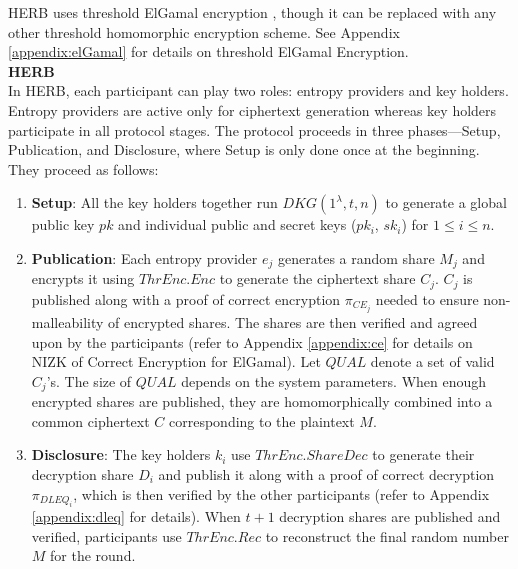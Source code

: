 \documentclass[letterpaper,twocolumn,10pt]{article}
\theoremstyle{definition}
\theoremstyle{remark}
\begin{document}
 HERB \cite{cherniaeva2019homomorphic} uses threshold ElGamal encryption \cite{desmedt1990Threshold}, though it can be replaced with any other threshold homomorphic encryption scheme. See Appendix \ref{appendix:elGamal} for details on threshold ElGamal Encryption. \\
 
\textbf{HERB}\\

In HERB, each participant can play two roles: entropy providers and key holders. Entropy providers are active only for ciphertext generation whereas key holders participate in all protocol stages. The protocol proceeds in three phases---Setup, Publication, and Disclosure, where Setup is only done once at the beginning. They proceed as follows:
\begin{enumerate}
    \item \textbf{Setup}: All the key holders together run $DKG(1^\lambda, t, n)$ to generate a global public key $pk$ and individual public and secret keys ($pk_i$, $sk_i$) for $1 \le i \le n$.
    
    \item \textbf{Publication}: Each entropy provider $e_j$ generates a random share $M_j$ and encrypts it using $ThrEnc.Enc$ to generate the ciphertext share $C_j$. $C_j$ is published along with a proof of correct encryption $\pi_{CE_{j}}$ needed to ensure non-malleability of encrypted shares. The shares are then verified and agreed upon by the participants (refer to Appendix \ref{appendix:ce} for details on NIZK of Correct Encryption for ElGamal). Let $QUAL$ denote a set of valid $C_j$'s. The size of $QUAL$ depends on the system parameters. When enough encrypted shares are published, they are homomorphically combined into a common ciphertext $C$ corresponding to the plaintext $M$.
    
    \item \textbf{Disclosure}: The key holders $k_i$ use $ThrEnc.ShareDec$ to generate their decryption share $D_i$ and publish it along with a proof of correct decryption $\pi_{DLEQ_{i}}$, which is then verified by the other participants (refer to Appendix \ref{appendix:dleq} for details). When $t+1$ decryption shares are published and verified, participants use $ThrEnc.Rec$ to reconstruct the final random number $M$ for the round.
\end{enumerate}
\end{document}
